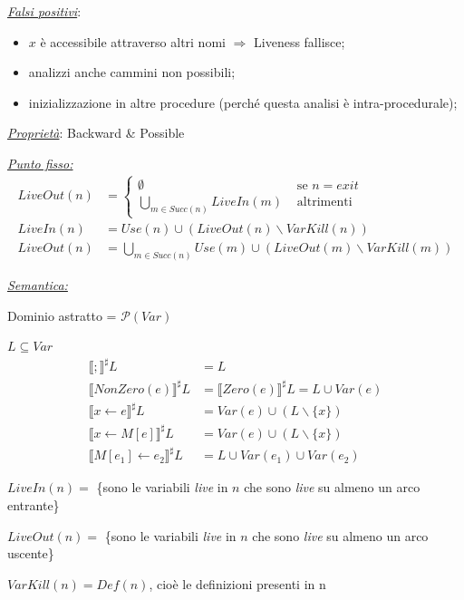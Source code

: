 \documentclass[a4paper, 11pt]{report}
\begin{document}
\noindent
\textit{\underline{Falsi positivi}}:
\begin{itemize}
	\item $x$ è accessibile attraverso altri nomi $\Rightarrow$ Liveness fallisce;
	\item analizzi anche cammini non possibili;
	\item inizializzazione in altre procedure (perché questa analisi è intra-procedurale);
\end{itemize}

\noindent
\textit{\underline{Proprietà}}: Backward \& Possible
\newline

\noindent
\underline{\textit{Punto fisso:}}
\begin{align*}
LiveOut(n) &=
\begin{cases}
\emptyset &\text{ se $n= exit$} \\
\bigcup_{m\in Succ(n)} LiveIn(m) &\text{ altrimenti}
\end{cases}\\
LiveIn(n) &= Use(n) \cup (LiveOut(n)\backslash VarKill(n))\\
LiveOut(n) &= \bigcup_{m\in Succ(n)} Use(m) \cup (LiveOut(m)\backslash VarKill(m))
\end{align*}

\noindent
\underline{\textit{Semantica:}}

Dominio astratto = $\mathcal{P}(Var)$

$L\subseteq Var$
\begin{align*}
\llbracket ; \rrbracket^\sharp L &= L\\
\llbracket NonZero(e) \rrbracket^\sharp L &= \llbracket Zero(e) \rrbracket^\sharp L = L \cup Var(e)\\
\llbracket x\leftarrow e \rrbracket^\sharp L &= Var(e) \cup (L\backslash\{x\})\\
\llbracket x\leftarrow M[e] \rrbracket^\sharp L &= Var(e) \cup (L\backslash\{x\})\\
\llbracket M[e_1]\leftarrow e_2 \rrbracket^\sharp L &= L \cup Var(e_1) \cup Var(e_2)
\end{align*}

$LiveIn(n) = $ \{sono le variabili \textit{live} in $n$ che sono \textit{live} su almeno un arco entrante\}

$LiveOut(n) = $ \{sono le variabili \textit{live} in $n$ che sono \textit{live} su almeno un arco uscente\}

$VarKill(n) = Def(n)$, cioè le definizioni presenti in n
\newline
\end{document}
